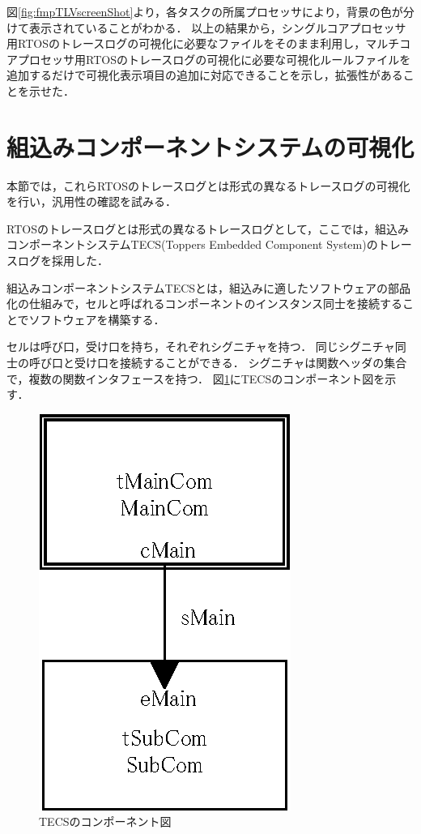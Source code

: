 図\ref{fig:fmpTLVscreenShot}より，各タスクの所属プロセッサにより，背景の色が分けて表示されていることがわかる．
以上の結果から，シングルコアプロセッサ用RTOSのトレースログの可視化に必要なファイルをそのまま利用し，マルチコアプロセッサ用RTOSのトレースログの可視化に必要な可視化ルールファイルを追加するだけで可視化表示項目の追加に対応できることを示し，拡張性があることを示せた．

\section{組込みコンポーネントシステムの可視化}

本節では，これらRTOSのトレースログとは形式の異なるトレースログの可視化を行い，汎用性の確認を試みる．

RTOSのトレースログとは形式の異なるトレースログとして，ここでは，組込みコンポーネントシステムTECS(Toppers Embedded Component System)\cite{TECS}のトレースログを採用した．

組込みコンポーネントシステムTECSとは，組込みに適したソフトウェアの部品化の仕組みで，セルと呼ばれるコンポーネントのインスタンス同士を接続することでソフトウェアを構築する．

セルは呼び口，受け口を持ち，それぞれシグニチャを持つ．
同じシグニチャ同士の呼び口と受け口を接続することができる．
シグニチャは関数ヘッダの集合で，複数の関数インタフェースを持つ．
図\ref{fig:tecsSample}にTECSのコンポーネント図を示す．

\begin{figure}[t]
\begin{center}
\includegraphics[scale=0.8]{img/tecsSample.eps}
\caption{TECSのコンポーネント図}
\label{fig:tecsSample}
\end{center}
\end{figure}

